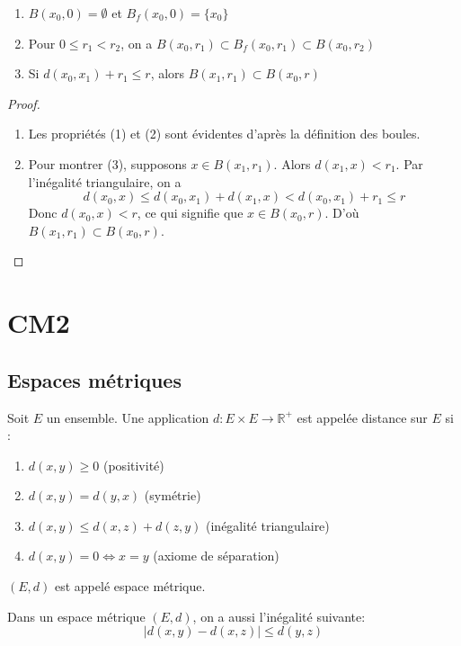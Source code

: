 \documentclass[oneside]{book}
\begin{document}
\begin{lemma}
\begin{enumerate}
    \item $B(x_0, 0) = \emptyset$ et $B_f(x_0, 0) = \{x_0\}$
    \item Pour $0 \leq r_1 < r_2$, on a $B(x_0, r_1) \subset B_f(x_0, r_1) \subset B(x_0, r_2)$
    \item Si $d(x_0, x_1) + r_1 \leq r$, alors $B(x_1, r_1) \subset B(x_0, r)$
\end{enumerate}
\end{lemma}

\begin{proof}
\begin{enumerate}
    \item Les propriétés (1) et (2) sont évidentes d'après la définition des boules.

    \item Pour montrer (3), supposons $x \in B(x_1, r_1)$. Alors $d(x_1, x) < r_1$.
    Par l'inégalité triangulaire, on a
    \[
    d(x_0, x) \leq d(x_0, x_1) + d(x_1, x) < d(x_0, x_1) + r_1 \leq r
    \]
    Donc $d(x_0, x) < r$, ce qui signifie que $x \in B(x_0, r)$. D'où $B(x_1, r_1) \subset B(x_0, r)$.
\end{enumerate}
\end{proof}\chapter{CM2}
\sloppy

\section{Espaces métriques}

\begin{definition}
Soit $E$ un ensemble. Une application $d : E \times E \to \mathbb{R}^+$ est appelée distance sur $E$ si :
\begin{enumerate}
    \item $d(x, y) \geq 0$ (positivité)
    \item $d(x, y) = d(y, x)$ (symétrie)
    \item $d(x, y) \leq d(x, z) + d(z, y)$ (inégalité triangulaire)
    \item $d(x, y) = 0 \Leftrightarrow x = y$ (axiome de séparation)
\end{enumerate}
$(E, d)$ est appelé espace métrique.
\end{definition}

\begin{proposition}
Dans un espace métrique $(E, d)$, on a aussi l'inégalité suivante:
\[
|d(x, y) - d(x, z)| \leq d(y, z)
\]
\end{proposition}
\end{document}
